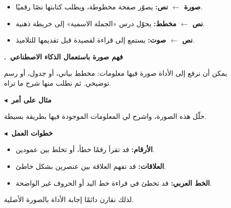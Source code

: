 \documentclass[a4paper]{article}
\newcounter{qism}
\newcommand{\qism}[1]{%
    \stepcounter{qism}%
    \par\bigskip
    {\large\khatt\bfseries{\color{asasi}\arabic{qism}.}\ {\color{dakin}#1}}\par
    \vspace{-2pt}{\color{black!20}\rule{\linewidth}{0.6pt}}\par\nopagebreak[4]
    \smallskip}
\newcommand{\far}[1]{\par\smallskip
    {\color{dakin}\khatt\bfseries {\color{asasi}$\blacktriangleleft$}\ #1}\par\nopagebreak[4]}
\begin{document}
\begin{arabiyya}
\begin{itemize}
    \item \textbf{صورة $\leftarrow$ نص:} يصوّر صفحة مخطوطة، ويطلب كتابتها نصًا رقميًا.
    \item \textbf{نص $\leftarrow$ مخطط:} يحوّل درس «الجملة الاسمية» إلى خريطة ذهنية.
    \item \textbf{نص $\leftarrow$ صوت:} يستمع إلى قراءة لقصيدة قبل تقديمها للتلاميذ.
\end{itemize}
\end{arabiyya}

\qism{فهم صورة باستعمال الذكاء الاصطناعي}

يمكن أن نرفع إلى الأداة صورة فيها معلومات:
مخطط بياني، أو جدول، أو رسم توضيحي.
ثم نطلب منها شرح ما تراه.

\far{مثال على أمر}
\begin{amr}[asasi]
حلّل هذه الصورة، واشرح لي المعلومات الموجودة فيها بطريقة بسيطة.
\end{amr}

\far{خطوات العمل}
\begin{center}
\end{center}

\begin{intabih}
\begin{itemize}
    \item \textbf{الأرقام:} قد تقرأ رقمًا خطأ، أو تخلط بين عمودين.
    \item \textbf{العلاقات:} قد تفهم العلاقة بين عنصرين بشكل خاطئ.
    \item \textbf{الخط العربي:} قد تخطئ في قراءة خط اليد أو الحروف غير الواضحة.
\end{itemize}
لذلك نقارن دائمًا إجابة الأداة بالصورة الأصلية.
\end{intabih}
\end{document}

